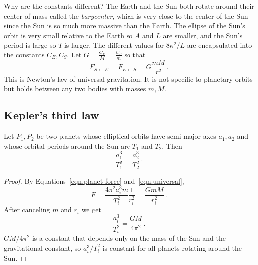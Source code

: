 Why are the constants different? The Earth and the Sun both rotate around their center of mass called the \emph{barycenter}, which is very close to the center of the Sun since the Sun is so much more massive than the Earth. The ellipse of the Sun's orbit is very small relative to the Earth so $A$ and $L$ are smaller, and the Sun's period is large so $T$ is larger. The different values for $8\kappa^2/L$ are encapsulated into the constants $C_E,C_S$. Let $G=\displaystyle\frac{C_E}{M}=\frac{C_S}{m}$ so that
\begin{equation}
F_{S\leftarrow E}=F_{E\leftarrow S}=G\frac{mM}{r^2}\,.\label{eqn.universal}
\end{equation}%
This is Newton's law of universal gravitation. It is not specific to planetary orbits but holds between any two bodies with masses $m,M$.

\subsection{Kepler's third law}

\begin{theorem}
Let $P_1, P_2$ be two planets whose elliptical orbits have semi-major axes $a_1, a_2$ and whose orbital periods around the Sun are $T_1$ and $T_2$. Then
\[
\frac{a_1^3}{T_1^2}=\frac{a_2^3}{T_2^2}\,.
\]
\end{theorem}
\begin{proof}
By Equations~\ref{eqn.planet-force} and~\ref{eqn.universal},
\[
F=\frac{4\pi^2 a_i^3 m}{T_i^2}\frac{1}{r_i^2}=\frac{GmM}{r_i^2}\,.
\]
After canceling $m$ and $r_i$ we get
\[
\frac{a_i^3}{T_i^2}=\frac{GM}{4\pi^2}\,.
\]
$GM/4\pi^2$ is a constant that depends only on the mass of the Sun and the gravitational constant, so $a_i^3/T_i^2$ is constant for all planets rotating around the Sun.\hqed
\end{proof}
